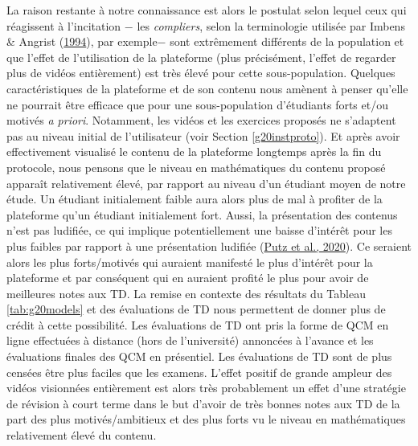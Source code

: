 \documentclass[
]{book}
\begin{document}
La raison restante à notre connaissance est alors le postulat selon lequel ceux qui réagissent à l'incitation \(-\) les \emph{compliers}, selon la terminologie utilisée par Imbens \& Angrist (\protect\hyperlink{ref-IMB:ANG:94}{1994}), par exemple\(-\) sont extrêmement différents de la population et que l'effet de l'utilisation de la plateforme (plus précisément, l'effet de regarder plus de vidéos entièrement) est très élevé pour cette sous-population. Quelques caractéristiques de la plateforme et de son contenu nous amènent à penser qu'elle ne pourrait être efficace que pour une sous-population d'étudiants forts et/ou motivés \emph{a priori}. Notamment, les vidéos et les exercices proposés ne s'adaptent pas au niveau initial de l'utilisateur (voir Section \ref{g20instproto}). Et après avoir effectivement visualisé le contenu de la plateforme longtemps après la fin du protocole, nous pensons que le niveau en mathématiques du contenu proposé apparaît relativement élevé, par rapport au niveau d'un étudiant moyen de notre étude. Un étudiant initialement faible aura alors plus de mal à profiter de la plateforme qu'un étudiant initialement fort. Aussi, la présentation des contenus n'est pas ludifiée, ce qui implique potentiellement une baisse d'intérêt pour les plus faibles par rapport à une présentation ludifiée (\protect\hyperlink{ref-PUT:eal:20}{Putz et al., 2020}). Ce seraient alors les plus forts/motivés qui auraient manifesté le plus d'intérêt pour la plateforme et par conséquent qui en auraient profité le plus pour avoir de meilleures notes aux TD. La remise en contexte des résultats du Tableau \ref{tab:g20models} et des évaluations de TD nous permettent de donner plus de crédit à cette possibilité. Les évaluations de TD ont pris la forme de QCM en ligne effectuées à distance (hors de l'université) annoncées à l'avance et les évaluations finales des QCM en présentiel. Les évaluations de TD sont de plus censées être plus faciles que les examens. L'effet positif de grande ampleur des vidéos visionnées entièrement est alors très probablement un effet d'une stratégie de révision à court terme dans le but d'avoir de très bonnes notes aux TD de la part des plus motivés/ambitieux et des plus forts vu le niveau en mathématiques relativement élevé du contenu.
\end{document}
